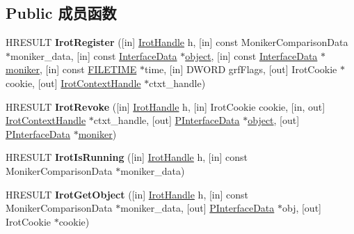 \subsection*{Public 成员函数}
\begin{DoxyCompactItemize}
\item 
\mbox{\label{interface_irot_a6b83abac29cb0b221372aac1a807c2d6}} 
H\+R\+E\+S\+U\+LT {\bfseries Irot\+Register} (\mbox{[}in\mbox{]} \hyperlink{interfacevoid}{Irot\+Handle} h, \mbox{[}in\mbox{]} const Moniker\+Comparison\+Data $\ast$moniker\+\_\+data, \mbox{[}in\mbox{]} const \hyperlink{struct_irot_1_1tag_interface_data}{Interface\+Data} $\ast$\hyperlink{structobject}{object}, \mbox{[}in\mbox{]} const \hyperlink{struct_irot_1_1tag_interface_data}{Interface\+Data} $\ast$\hyperlink{structmoniker}{moniker}, \mbox{[}in\mbox{]} const \hyperlink{struct___f_i_l_e_t_i_m_e}{F\+I\+L\+E\+T\+I\+ME} $\ast$time, \mbox{[}in\mbox{]} D\+W\+O\+RD grf\+Flags, \mbox{[}out\mbox{]} Irot\+Cookie $\ast$cookie, \mbox{[}out\mbox{]} \hyperlink{interfacevoid}{Irot\+Context\+Handle} $\ast$ctxt\+\_\+handle)
\item 
\mbox{\label{interface_irot_ad2bbff57d3afbea865a99e955d232bfb}} 
H\+R\+E\+S\+U\+LT {\bfseries Irot\+Revoke} (\mbox{[}in\mbox{]} \hyperlink{interfacevoid}{Irot\+Handle} h, \mbox{[}in\mbox{]} Irot\+Cookie cookie, \mbox{[}in, out\mbox{]} \hyperlink{interfacevoid}{Irot\+Context\+Handle} $\ast$ctxt\+\_\+handle, \mbox{[}out\mbox{]} \hyperlink{struct_irot_1_1tag_interface_data}{P\+Interface\+Data} $\ast$\hyperlink{structobject}{object}, \mbox{[}out\mbox{]} \hyperlink{struct_irot_1_1tag_interface_data}{P\+Interface\+Data} $\ast$\hyperlink{structmoniker}{moniker})
\item 
\mbox{\label{interface_irot_a97855f0b6f395f44df5a49d01752709b}} 
H\+R\+E\+S\+U\+LT {\bfseries Irot\+Is\+Running} (\mbox{[}in\mbox{]} \hyperlink{interfacevoid}{Irot\+Handle} h, \mbox{[}in\mbox{]} const Moniker\+Comparison\+Data $\ast$moniker\+\_\+data)
\item 
\mbox{\label{interface_irot_a2b0c3762010d394948457b383bc1454c}} 
H\+R\+E\+S\+U\+LT {\bfseries Irot\+Get\+Object} (\mbox{[}in\mbox{]} \hyperlink{interfacevoid}{Irot\+Handle} h, \mbox{[}in\mbox{]} const Moniker\+Comparison\+Data $\ast$moniker\+\_\+data, \mbox{[}out\mbox{]} \hyperlink{struct_irot_1_1tag_interface_data}{P\+Interface\+Data} $\ast$obj, \mbox{[}out\mbox{]} Irot\+Cookie $\ast$cookie)

\end{DoxyCompactItemize}
